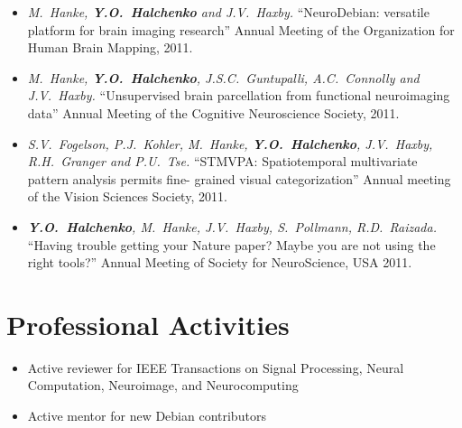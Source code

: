 \documentclass[12pt,overlapped,line]{res}
\newcommand{\mtitle}[1]{``#1''}
\newcommand{\mauthors}[1]{ \textit{#1.}}
\newcommand{\mwhere}[1]{#1.}
\begin{document}
\begin{resume}
\begin{itemize}
 \item
   \mauthors{M.~Hanke, \textbf{Y.O.~Halchenko} and J.V.~Haxby}
   \mtitle{NeuroDebian: versatile platform for brain imaging research}
   \mwhere{Annual Meeting of the Organization for Human Brain Mapping, 2011}

 \item
   \mauthors{M.~Hanke, \textbf{Y.O.~Halchenko}, J.S.C.~Guntupalli,
     A.C.~Connolly and J.V.~Haxby}
   \mtitle{Unsupervised brain parcellation from functional neuroimaging data}
   \mwhere{Annual Meeting of the Cognitive Neuroscience Society, 2011}

 \item
   \mauthors{S.V.~Fogelson, P.J.~Kohler, M.~Hanke, \textbf{Y.O.~Halchenko}, J.V.~Haxby,
     R.H.~Granger and P.U.~Tse}
   \mtitle{STMVPA: Spatiotemporal
     multivariate pattern analysis permits fine- grained visual
     categorization}
   \mwhere{Annual meeting of the Vision Sciences Society, 2011}

 \item
   \mauthors{\textbf{Y.O.~Halchenko}, M.~Hanke, J.V.~Haxby,
     S.~Pollmann, R.D.~Raizada}
   \mtitle{Having trouble getting your Nature paper? Maybe you are not
     using the right tools?}
   \mwhere{Annual Meeting of Society for NeuroScience, USA 2011}

% 
% 

\end{itemize}

\section{Professional Activities}
\begin{itemize}
\item Active reviewer for IEEE Transactions on Signal Processing,
  Neural Computation, Neuroimage, and Neurocomputing
\item Active mentor for new Debian contributors
\end{itemize}



\end{resume}
\end{document}
